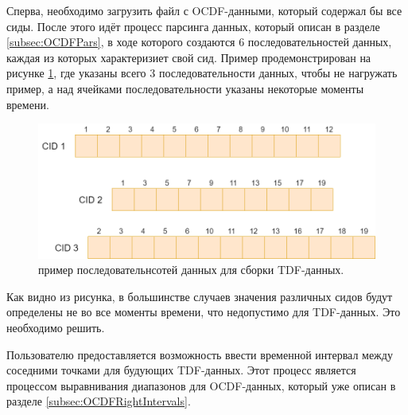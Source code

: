 {\standartFont

  \par Сперва, необходимо загрузить файл с OCDF-данными, который содержал бы все сиды. После этого идёт процесс парсинга данных, который описан в разделе \ref{subsec:OCDFPars}, в ходе которого создаются 6 последовательностей данных, каждая из которых характеризиет свой сид. Пример продемонстрирован на рисунке \ref{fig:CreateTDFstage1}, где указаны всего 3 последовательности данных, чтобы не нагружать пример, а над ячейками последовательности указаны некоторые моменты времени. 

  \begin{figure}[H]
    \centering
    \includegraphics[width=\textwidth]{images/forDataManipulator/CreateTDFstage1.drawio.png}
    \caption{пример последовательнсотей данных для сборки TDF-данных.} 
    \label{fig:CreateTDFstage1}
  \end{figure}

  \par Как видно из рисунка, в большинстве случаев значения различных сидов будут определены не во все моменты времени, что недопустимо для TDF-данных. Это необходимо решить.

  \par Пользователю предоставляется возможность ввести временной интервал между соседними точками для будующих TDF-данных. Этот процесс является процессом выравнивания диапазонов для OCDF-данных, который уже описан в разделе \ref{subsec:OCDFRightIntervals}.

}
